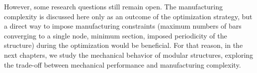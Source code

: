 However, some research questions still remain open. The manufacturing complexity is discussed here only as an outcome of the optimization strategy, but a direct way to impose manufacturing constraints (maximum numbers of bars converging to a single node, minimum section, imposed periodicity of the structure) during the optimization would be beneficial. For that reason, in the next chapters, we study the mechanical behavior of modular structures, exploring the trade-off between mechanical performance and manufacturing complexity.